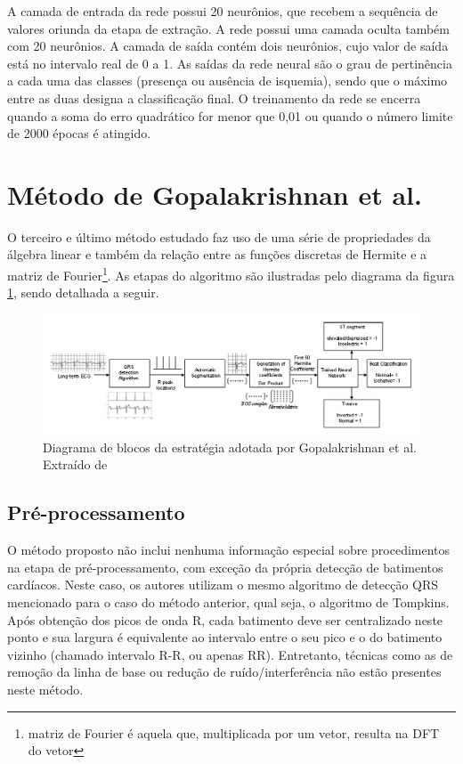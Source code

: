 A camada de entrada da rede possui 20 neurônios, que recebem a sequência de valores oriunda da etapa de extração. A rede possui uma camada oculta também com 20 neurônios. A camada de saída contém dois neurônios, cujo valor de saída está no intervalo real de 0 a 1. As saídas da rede neural são o grau de pertinência a cada uma das classes (presença ou ausência de isquemia), sendo que o máximo entre as duas designa a classificação final. O treinamento da rede se encerra quando a soma do erro quadrático for menor que 0,01 ou quando o número limite de 2000 épocas é atingido.


\section{Método de Gopalakrishnan et al.}
\label{sec:gopalak}

O terceiro e último método estudado faz uso de uma série de propriedades da álgebra linear e também da relação entre as funções discretas de Hermite e a matriz de Fourier\footnote{matriz de Fourier é aquela que, multiplicada por um vetor, resulta na DFT do vetor}. As etapas do algoritmo são ilustradas pelo diagrama da figura \ref{fig:gopalakdiag}, sendo detalhada a seguir.

\begin{figure}[ht]
    \centering
    \includegraphics[width=1.0\textwidth]{figures/chap5-gopalak-diagram.png}
    \caption[Diagrama de blocos da estratégia adotada por Gopalakrishnan et al.]{Diagrama de blocos da estratégia adotada por Gopalakrishnan et al. Extraído de \cite{Gopalakrishnan2004}}
    \label{fig:gopalakdiag}
\end{figure}

\subsection*{Pré-processamento}
O método proposto não inclui nenhuma informação especial sobre procedimentos na etapa de pré-processamento, com exceção da própria detecção de batimentos cardíacos. Neste caso, os autores utilizam o mesmo algoritmo de detecção QRS mencionado para o caso do método anterior, qual seja, o algoritmo de Tompkins. Após obtenção dos picos de onda R, cada batimento deve ser centralizado neste ponto e sua largura é equivalente ao intervalo entre o seu pico e o do batimento vizinho (chamado intervalo R-R, ou apenas RR). Entretanto, técnicas como as de remoção da linha de base ou redução de ruído/interferência não estão presentes neste método.

